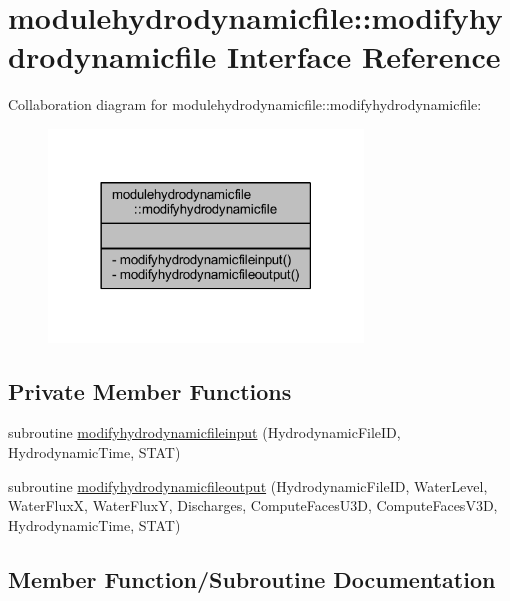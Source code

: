 \hypertarget{interfacemodulehydrodynamicfile_1_1modifyhydrodynamicfile}{}\section{modulehydrodynamicfile\+:\+:modifyhydrodynamicfile Interface Reference}
\label{interfacemodulehydrodynamicfile_1_1modifyhydrodynamicfile}


Collaboration diagram for modulehydrodynamicfile\+:\+:modifyhydrodynamicfile\+:\nopagebreak
\begin{figure}[H]
\begin{center}
\leavevmode
\includegraphics[width=237pt]{interfacemodulehydrodynamicfile_1_1modifyhydrodynamicfile__coll__graph}
\end{center}
\end{figure}
\subsection*{Private Member Functions}
\begin{DoxyCompactItemize}
\item 
subroutine \mbox{\hyperlink{interfacemodulehydrodynamicfile_1_1modifyhydrodynamicfile_a0e0ba0cc25b0a610e84444c422886bd0}{modifyhydrodynamicfileinput}} (Hydrodynamic\+File\+ID, Hydrodynamic\+Time, S\+T\+AT)
\item 
subroutine \mbox{\hyperlink{interfacemodulehydrodynamicfile_1_1modifyhydrodynamicfile_af4c11107bb73408b45614aa9a16648f5}{modifyhydrodynamicfileoutput}} (Hydrodynamic\+File\+ID, Water\+Level, Water\+FluxX, Water\+FluxY, Discharges, Compute\+Faces\+U3D, Compute\+Faces\+V3D, Hydrodynamic\+Time, S\+T\+AT)
\end{DoxyCompactItemize}


\subsection{Member Function/\+Subroutine Documentation}
\mbox{\label{interfacemodulehydrodynamicfile_1_1modifyhydrodynamicfile_a0e0ba0cc25b0a610e84444c422886bd0}} 
